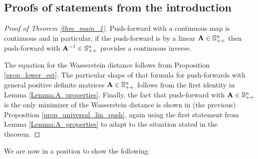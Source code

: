 \documentclass{amsart}
\numberwithin{equation}{section}
\newcommand\bA{{\bf A}}
\theoremstyle{plain}
\theoremstyle{definition}
\begin{document}
\subsection{Proofs of statements from the introduction}
\begin{proof}[Proof of Theorem \ref{thm_main_1}] 
Push-forward with a continuous map is continuous and in particular, if the push-forward is by a linear $\bA \in \mathbb{S}^n_{++}$ then push-forward with $\bA^{-1} \in \mathbb{S}^n_{++}$ provides a continuous inverse. 

The equation for the Wasserstein distance follows from Proposition \ref{prop_lower_est}. 
The particular shape of that formula for push-forwards with general positive definite matrices $\bA \in \mathbb{S}^n_{++}$ 
follows from the first identity in Lemma \ref{Lemma:A_properties}. Finally, the fact that push-forward with
$\bA \in \mathbb{S}^n_{++}$ is the only minimizer of the Wasserstein distance is shown in (the previous) Proposition \ref{prop_universal_lin_push}, again
using the first statement from Lemma \ref{Lemma:A_properties} to adapt to the situation stated in the theorem. 
\end{proof}
We are now in a position to show the following: 
\end{document}
